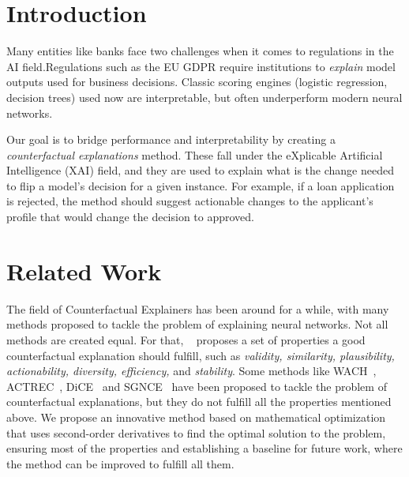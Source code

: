 \documentclass[12pt]{extarticle}
\numberwithin{equation}{section}
\begin{document}
\newpage
\tableofcontents
\thispagestyle{fancy}

\newpage

\section*{Introduction}
Many entities like banks face two challenges when it comes to regulations in the AI field.Regulations such as the EU GDPR require institutions to \emph{explain} model outputs used for business decisions. Classic scoring engines (logistic regression, decision trees) used now are interpretable, but often underperform modern neural networks.

Our goal is to bridge performance and interpretability by creating a \emph{counterfactual explanations} method. These fall under the eXplicable Artificial Intelligence (XAI) field, and they are used to explain what is the change needed to flip 
a model's decision for a given instance. For example, if a loan application is rejected, the method should suggest actionable changes to the applicant's profile that would change the decision to approved. %

\section*{Related Work}
The field of Counterfactual Explainers has been around for a while, with many methods proposed to tackle the problem of explaining neural networks. Not all methods are created equal. For that, ~\cite{guidotti2024counterfactual} proposes a set of properties a good counterfactual explanation should fulfill, such as \emph{validity, similarity, plausibility, actionability, diversity, efficiency,} and \emph{stability}. Some methods like WACH~\cite{wachter2017counterfactual}, ACTREC~\cite{ustun2019actionable}, DiCE~\cite{dice} and SGNCE~\cite{sgnce} have been proposed to tackle the problem of counterfactual explanations, but they do not fulfill all the properties mentioned above. We propose an innovative method based on mathematical optimization that uses second-order derivatives to find the optimal solution to the problem, ensuring most of the properties and establishing a baseline for future work, where the method can be improved to fulfill all them.
\end{document}
